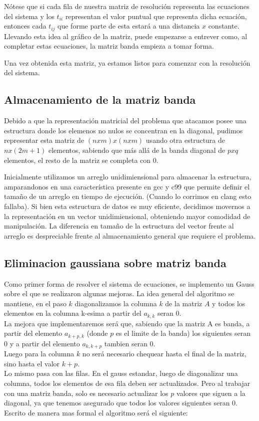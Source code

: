 N\'otese que si cada fila de nuestra matriz de resoluci\'on representa las ecuaciones del sistema y los $t_{ii}$ representan el valor puntual que representa dicha ecuaci\'on, entonces cada $t_{ij}$ que forme parte de esta estar\'a a una distancia $x$ constante.
Llevando esta idea al gr\'afico de la matriz, puede empezarse a entrever como, al completar estas ecuaciones, la matriz banda empieza a tomar forma.

Una vez obtenida esta matriz, ya estamos listos para comenzar con la resoluci\'on del sistema.

\subsection{Almacenamiento de la matriz banda}

Debido a que la representaci\'on matricial del problema que atacamos posee una estructura donde los elemenos no nulos se concentran en la diagonal, pudimos representar esta matriz de $(nxm)x(nxm)$ usando otra estructura de $nx(2m+1)$ elementos, sabiendo que m\'as all\'a de la banda diagonal de $pxq$ elementos, el resto de la matriz se completa con 0.

Inicialmente utilizamos un arreglo unidimiensional para almacenar la estructura, amparandonos en una caracter\'istica presente en gcc y c99 que permite definir el tama\~no de un arreglo en tiempo de ejecuci\'on. (Cuando lo corrimos en clang esto fallaba).
Si bien esta estructura de datos es muy eficiente, decidimos movernos a la representaci\'on en un vector unidimiensional, obteniendo mayor comodidad de manipulaci\'on. La diferencia en tama\~no de la estructura del vector frente al arreglo es despreciable frente al almacenamiento general que requiere el problema.


\subsection{Eliminacion gaussiana sobre matriz banda}

Como primer forma de resolver el sistema de ecuaciones, se implemento un Gauss sobre el que se realizaron algunas mejoras. La idea general del algoritmo se mantiene, en el paso $k$ diagonalizamos la columna $k$ de la matriz $A$ y todos los elementos en la columna k-esima a partir del $a_{k,k}$ seran $0$.
\\
La mejora que implementaremos ser\'a que, sabiendo que la matriz A es banda, a partir del elemento $a_{k+p,k}$ (donde $p$ es el limite de la banda) los siguientes seran $0$ y a partir del elemento $a_{k,k+p}$ tambien seran $0$.
\\
Luego para la columna $k$ no ser\'a necesario chequear hasta el final de la matriz, sino hasta el valor $k+p$.
\\
Lo mismo pasa con las filas. En el gauss estandar, luego de diagonalizar una columna, todos los elementos de esa fila deben ser actualizados. Pero al trabajar con una matriz banda, solo es necesario actualizar los $p$ valores que siguen a la diagonal, ya que tenemos asegurado que todos los valores siguientes seran $0$.
\\
Escrito de manera mas formal el algoritmo ser\'a el siguiente:

